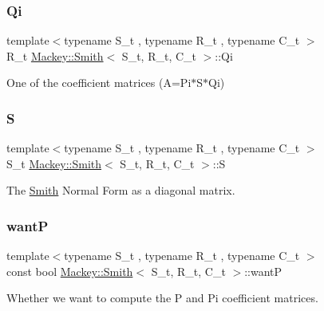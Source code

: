 \subsubsection{\texorpdfstring{Qi}{Qi}}
{\footnotesize\ttfamily template$<$typename S\+\_\+t , typename R\+\_\+t , typename C\+\_\+t $>$ \\
R\+\_\+t \hyperlink{classMackey_1_1Smith}{Mackey\+::\+Smith}$<$ S\+\_\+t, R\+\_\+t, C\+\_\+t $>$\+::Qi}



One of the coefficient matrices (A=Pi$\ast$\+S$\ast$\+Qi) 

\mbox{\label{classMackey_1_1Smith_a2c4e977af966b2956354dce7e40dd5e1}} 
\subsubsection{\texorpdfstring{S}{S}}
{\footnotesize\ttfamily template$<$typename S\+\_\+t , typename R\+\_\+t , typename C\+\_\+t $>$ \\
S\+\_\+t \hyperlink{classMackey_1_1Smith}{Mackey\+::\+Smith}$<$ S\+\_\+t, R\+\_\+t, C\+\_\+t $>$\+::S\hspace{0.3cm}{\ttfamily [protected]}}



The \hyperlink{classMackey_1_1Smith}{Smith} Normal Form as a diagonal matrix. 

\mbox{\label{classMackey_1_1Smith_a7033b338fda868e33f50950d2444ae75}} 
\subsubsection{\texorpdfstring{wantP}{wantP}}
{\footnotesize\ttfamily template$<$typename S\+\_\+t , typename R\+\_\+t , typename C\+\_\+t $>$ \\
const bool \hyperlink{classMackey_1_1Smith}{Mackey\+::\+Smith}$<$ S\+\_\+t, R\+\_\+t, C\+\_\+t $>$\+::wantP\hspace{0.3cm}{\ttfamily [protected]}}



Whether we want to compute the P and Pi coefficient matrices. 

\mbox{\label{classMackey_1_1Smith_a10ec727132ca15eee9dac0522d617a50}} 
